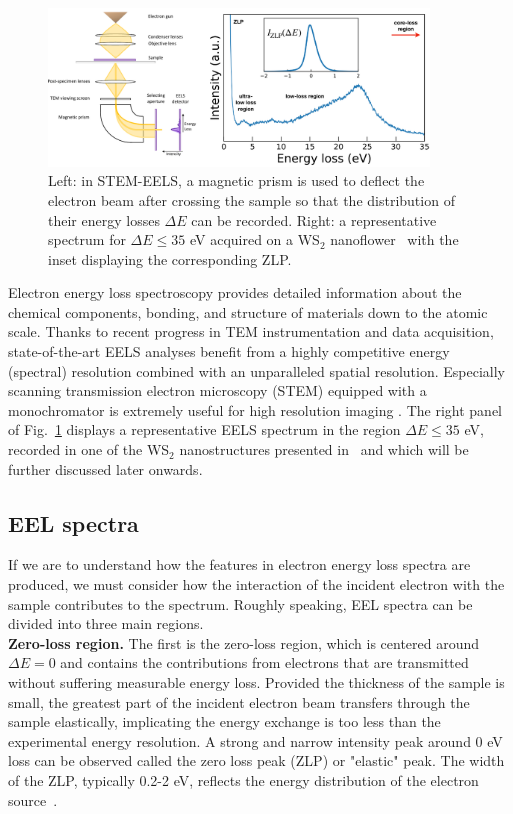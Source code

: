 \begin{figure}[h]
    \centering
    \includegraphics[width=0.9\textwidth]{plots/EELS.pdf}
    \caption{Left: in STEM-EELS, a magnetic
      prism is used to deflect the electron beam after crossing the sample
      so that the distribution of their energy losses $\Delta E$ can be recorded.
      Right: a representative spectrum for $\Delta E \le 35$ eV acquired 
      on a WS$_2$ nanoflower~\cite{SabryaWS2} with
      the inset displaying the corresponding ZLP.
      }
    \label{fig:EELS}
\end{figure}

Electron energy loss spectroscopy  provides detailed information about the 
chemical components, bonding, and structure of materials down to the atomic scale.
%
Thanks to recent progress in TEM instrumentation and data acquisition, state-of-the-art 
EELS analyses benefit from
a highly competitive energy (spectral) resolution combined with an unparalleled spatial resolution.
%
Especially scanning transmission electron microscopy (STEM) equipped with a monochromator 
is extremely useful for high resolution imaging \cite{krivanek}.
The right panel of Fig.~\ref{fig:EELS} displays
a representative EELS spectrum in the region $\Delta E \le 35$ eV, recorded
in one of the WS$_2$ nanostructures presented in~\cite{SabryaWS2}
and which will be further discussed later onwards.

\subsection{EEL spectra}
If we are to understand how the features in electron energy loss spectra are produced, 
we must consider how the interaction of the incident electron with the sample 
contributes to the spectrum. 
%
Roughly speaking, EEL spectra can be divided into three main regions.\\

{\bf Zero-loss region.} The first is the zero-loss region, which is centered around $\Delta E=0$
and contains the contributions from electrons that are transmitted without suffering
measurable energy loss.
%
Provided the thickness of the sample is small, the greatest part of the 
incident electron beam transfers through the sample elastically, 
implicating the energy exchange is too less than the experimental energy resolution. 
%
A strong and narrow intensity peak around 0 eV loss can be observed called the zero loss peak (ZLP) or "elastic" peak. 
The width of the ZLP, typically 0.2-2 eV, reflects the energy distribution of the electron source~\cite{egerton}.

